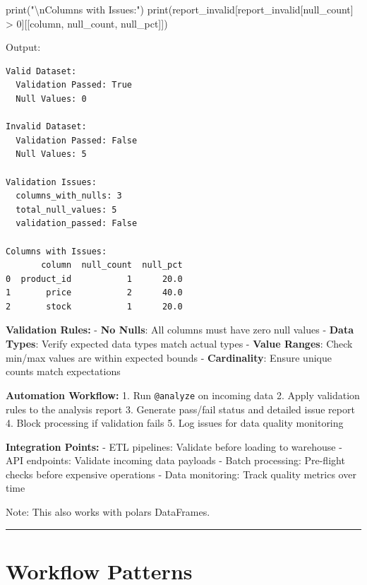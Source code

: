 \documentclass[
  letterpaper,
]{scrbook}
\newenvironment{Shaded}{\begin{snugshade}}{\end{snugshade}}
\newcommand{\BuiltInTok}[1]{\textcolor[rgb]{0.00,0.23,0.31}{#1}}
\newcommand{\CharTok}[1]{\textcolor[rgb]{0.13,0.47,0.30}{#1}}
\newcommand{\DecValTok}[1]{\textcolor[rgb]{0.68,0.00,0.00}{#1}}
\newcommand{\NormalTok}[1]{\textcolor[rgb]{0.00,0.23,0.31}{#1}}
\newcommand{\OperatorTok}[1]{\textcolor[rgb]{0.37,0.37,0.37}{#1}}
\newcommand{\StringTok}[1]{\textcolor[rgb]{0.13,0.47,0.30}{#1}}
\begin{document}
\begin{Shaded}
\begin{Highlighting}[]
    \BuiltInTok{print}\NormalTok{(}\StringTok{"}\CharTok{\textbackslash{}n}\StringTok{Columns with Issues:"}\NormalTok{)}
    \BuiltInTok{print}\NormalTok{(report\_invalid[report\_invalid[}\StringTok{\textquotesingle{}null\_count\textquotesingle{}}\NormalTok{] }\OperatorTok{\textgreater{}} \DecValTok{0}\NormalTok{][[}\StringTok{\textquotesingle{}column\textquotesingle{}}\NormalTok{, }\StringTok{\textquotesingle{}null\_count\textquotesingle{}}\NormalTok{, }\StringTok{\textquotesingle{}null\_pct\textquotesingle{}}\NormalTok{]])}
\end{Highlighting}
\end{Shaded}

Output:

\begin{verbatim}
Valid Dataset:
  Validation Passed: True
  Null Values: 0

Invalid Dataset:
  Validation Passed: False
  Null Values: 5

Validation Issues:
  columns_with_nulls: 3
  total_null_values: 5
  validation_passed: False

Columns with Issues:
       column  null_count  null_pct
0  product_id           1      20.0
1       price           2      40.0
2       stock           1      20.0
\end{verbatim}

\textbf{Validation Rules:} - \textbf{No Nulls}: All columns must have
zero null values - \textbf{Data Types}: Verify expected data types match
actual types - \textbf{Value Ranges}: Check min/max values are within
expected bounds - \textbf{Cardinality}: Ensure unique counts match
expectations

\textbf{Automation Workflow:} 1. Run \texttt{@analyze} on incoming data
2. Apply validation rules to the analysis report 3. Generate pass/fail
status and detailed issue report 4. Block processing if validation fails
5. Log issues for data quality monitoring

\textbf{Integration Points:} - ETL pipelines: Validate before loading to
warehouse - API endpoints: Validate incoming data payloads - Batch
processing: Pre-flight checks before expensive operations - Data
monitoring: Track quality metrics over time

Note: This also works with polars DataFrames.

\begin{center}\rule{0.5\linewidth}{0.5pt}\end{center}

\section{Workflow Patterns}\label{workflow-patterns}
\end{document}
